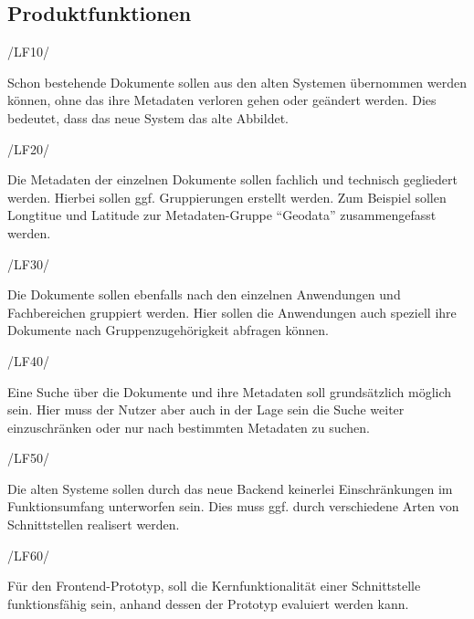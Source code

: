 \subsection{Produktfunktionen} \label{Produktfunktionen}
\begin{minipage}{3cm}
/LF10/
\end{minipage}
\begin{minipage}{13cm}
Schon bestehende Dokumente sollen aus den alten Systemen \"ubernommen werden k\"onnen, ohne das ihre Metadaten verloren gehen oder ge\"andert werden. Dies bedeutet, dass das neue System das alte Abbildet.\\
\end{minipage}
\begin{minipage}{3cm}
/LF20/
\end{minipage}
\begin{minipage}{13cm}
Die Metadaten der einzelnen Dokumente sollen fachlich und technisch gegliedert werden. Hierbei sollen ggf. Gruppierungen erstellt werden. Zum Beispiel sollen Longtitue und Latitude zur Metadaten-Gruppe "`Geodata"' zusammengefasst werden.\\
\end{minipage}
\begin{minipage}{3cm}
/LF30/
\end{minipage}
\begin{minipage}{13cm}
Die Dokumente sollen ebenfalls nach den einzelnen Anwendungen und Fachbereichen gruppiert werden. Hier sollen die Anwendungen auch speziell ihre Dokumente nach Gruppenzugeh\"origkeit abfragen k\"onnen. \\
\end{minipage}
\begin{minipage}{3cm}
/LF40/
\end{minipage}
\begin{minipage}{13cm}
Eine Suche \"uber die Dokumente und ihre Metadaten soll grunds\"atzlich m\"oglich sein. Hier muss der Nutzer aber auch in der Lage sein die Suche weiter einzuschr\"anken oder nur nach bestimmten Metadaten zu suchen.\\
\end{minipage}
\begin{minipage}{3cm}
/LF50/
\end{minipage}
\begin{minipage}{13cm}
Die alten Systeme sollen durch das neue Backend keinerlei Einschr\"ankungen im Funktionsumfang unterworfen sein. Dies muss ggf. durch verschiedene Arten von Schnittstellen realisert werden.\\
\end{minipage}
\begin{minipage}{3cm}
/LF60/
\end{minipage}
\begin{minipage}{13cm}
F\"ur den Frontend-Prototyp, soll die Kernfunktionalit\"at einer Schnittstelle funktionsf\"ahig sein, anhand dessen der Prototyp evaluiert werden kann.\\
\end{minipage}

